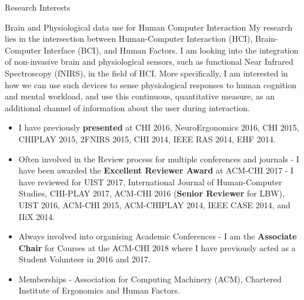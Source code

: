 \documentclass{resume} %
\begin{document}
	\begin{rSection}{Research Interests}
		\begin{rSubsection}{Brain and Physiological data use for Human Computer Interaction}{ }{ }{ }
			\vspace{-5 mm}
			My research lies in the intersection between Human-Computer Interaction (HCI), Brain-Computer Interface (BCI), and Human Factors. I am looking into the integration of non-invasive brain and physiological sensors, such as functional Near Infrared Spectroscopy (fNIRS), in the field of HCI. More specifically, I am interested in how we can use such devices to sense physiological responses to human cognition and mental workload, and use this continuous, quantitative measure, as an additional channel of information about the user during interaction.
			
\begin{itemize}
	\item I have previously \textbf{presented} at CHI 2016, NeuroErgonomics 2016, CHI 2015, CHIPLAY 2015, 2FNIRS 2015, CHI 2014, IEEE RAS 2014, EHF 2014.
	\item Often involved in the Review process for multiple conferences and journals - I have been awarded the \textbf{Excellent Reviewer Award} at ACM-CHI 2017 - I have reviewed for UIST 2017, International Journal of Human-Computer Studies, CHI-PLAY 2017, ACM-CHI 2016 (\textbf{Senior Reviewer} for LBW), UIST 2016, ACM-CHI 2015, ACM-CHIPLAY 2014, IEEE CASE 2014, and IIiX 2014.
	\item Always involved into organising Academic Conferences - I am the \textbf{Associate Chair} for Courses at the ACM-CHI 2018 where I have previously acted as a Student Volunteer in 2016 and 2017.
	\item  Memberships - Association for Computing Machinery (ACM), Chartered Institute of Ergonomics and Human Factors.
\end{itemize}
			
		\end{rSubsection}
		
	\end{rSection}
\end{document}
